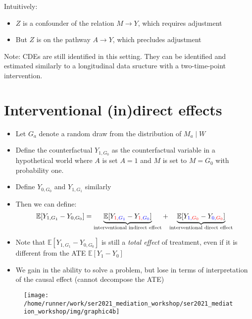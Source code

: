 \documentclass[
  12pt,
]{book}
\providecommand{\tightlist}{%
  \setlength{\itemsep}{0pt}\setlength{\parskip}{0pt}}
\theoremstyle{definition}
\theoremstyle{definition}
\theoremstyle{definition}
\newcommand{\E}{\mathbb{E}}
\newcommand{\1}{\mathbbm{1}}
\begin{document}
Intuitively:

\begin{itemize}
\tightlist
\item
  \(Z\) is a confounder of the relation \(M \rightarrow Y\), which requires
  adjustment
\item
  But \(Z\) is on the pathway \(A\rightarrow Y\), which precludes adjustment
\end{itemize}

Note: CDEs are still identified in this setting. They can be identified and
estimated similarly to a longitudinal data sructure with a two-time-point
intervention.

\hypertarget{interventional-indirect-effects}{%
\section{Interventional (in)direct effects}\label{interventional-indirect-effects}}

\begin{itemize}
\tightlist
\item
  Let \(G_a\) denote a random draw from the distribution of \(M_a \mid W\)
\item
  Define the counterfactual \(Y_{1,G_0}\) as the counterfactual
  variable in a hypothetical world where \(A\) is set \(A=1\) and \(M\) is
  set to \(M=G_0\) with probability one.
\item
  Define \(Y_{0,G_0}\) and \(Y_{1,G_1}\) similarly
\item
  Then we can define:
  \begin{equation*}
  \E[Y_{1,G_1} - Y_{0,G_0}] = \underbrace{\E[Y_{\color{red}{1},\color{blue}{G_1}} -
    Y_{\color{red}{1},\color{blue}{G_0}}]}_{\text{interventional indirect effect}} +
    \underbrace{\E[Y_{\color{blue}{1},\color{red}{G_0}} -
    Y_{\color{blue}{0},\color{red}{G_0}}]}_{\text{interventional direct effect}}
  \end{equation*}
\item
  Note that \(\E[Y_{1,G_1} - Y_{0,G_0}]\) is still a \emph{total effect} of treatment,
  even if it is different from the ATE \(\E[Y_{1} - Y_{0}]\)
\item
  We gain in the ability to solve a problem, but lose in terms of interpretation
  of the causal effect (cannot decompose the ATE)
\end{itemize}

\begin{figure}

{\centering \texttt{[image: /home/runner/work/ser2021\_mediation\_workshop/ser2021\_mediation\_workshop/img/graphic4b]} 

}

\end{figure}
\end{document}
